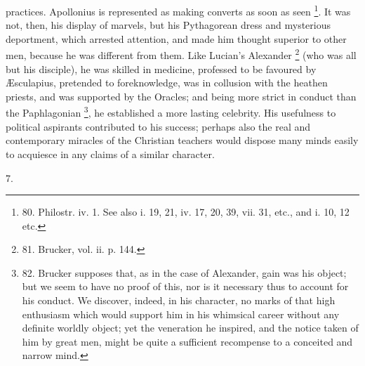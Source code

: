 practices. Apollonius is represented as making converts as soon as
seen \footnote{80.
Philostr. iv. 1. See also i. 19, 21, iv. 17, 20, 39, vii. 31, etc.,
and i. 10, 12 etc.}. It was not,
then, his display of marvels, but his
Pythagorean dress and mysterious deportment, which arrested attention,
and made him thought superior to other men, because he was different
from them. Like Lucian's Alexander \footnote{81.
Brucker, vol. ii. p. 144.} (who was all but his disciple), he was skilled in medicine,
professed to be favoured by Æsculapius, pretended to foreknowledge,
was in collusion with the heathen priests, and was supported by the
Oracles; and being more strict in conduct than the Paphlagonian \footnote{82.
Brucker supposes that, as in the case of Alexander, gain was his
object; but we seem to have no proof of this, nor is it necessary thus
to account for his conduct. We discover, indeed, in his character, no
marks of that high enthusiasm which would support him in his whimsical
career without any definite worldly object; yet the veneration he
inspired, and the notice taken of him by great men, might be quite a
sufficient recompense to a conceited and narrow mind.}, he established a more lasting celebrity. His usefulness to
political aspirants contributed to his success; perhaps also the real
and contemporary miracles of the Christian teachers would dispose many
minds easily to acquiesce in any claims of a similar character.

7.

